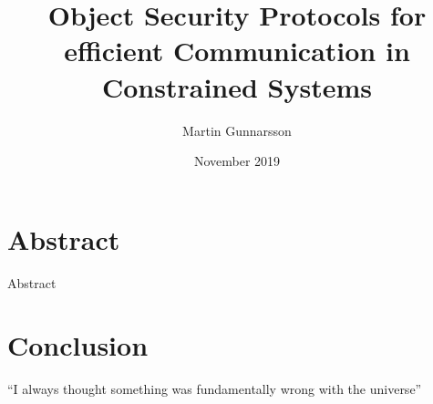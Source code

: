 \documentclass{article}
\title{Object Security Protocols for efficient Communication in Constrained Systems}
\author{Martin Gunnarsson }
\date{November 2019}
\begin{document}
\maketitle

\section{Abstract}
Abstract 





\section{Conclusion}
``I always thought something was fundamentally wrong with the universe'' \citep{adams1995hitchhiker}



\end{document}
